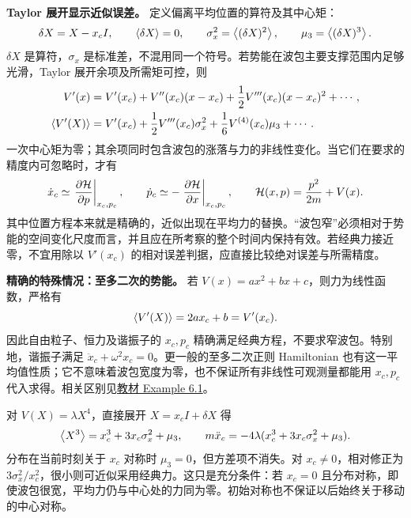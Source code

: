 \textbf{Taylor 展开显示近似误差。}
定义偏离平均位置的算符及其中心矩：
\begin{equation}
  \delta X=X-x_cI,\qquad
  \left\langle \delta X \right\rangle=0,\qquad
  \sigma_x^2=\left\langle (\delta X)^2 \right\rangle,\qquad
  \mu_3=\left\langle (\delta X)^3 \right\rangle.
\end{equation}
$\delta X$ 是算符，$\sigma_x$ 是标准差，不混用同一个符号。若势能在波包主要支撑范围内足够光滑，Taylor 展开余项及所需矩可控，则
\begin{align}
  V'(x)&=V'(x_c)+V''(x_c)(x-x_c)
          +\frac12V'''(x_c)(x-x_c)^2+\cdots,\\
  \left\langle V'(X) \right\rangle
    &=V'(x_c)+\frac12V'''(x_c)\sigma_x^2
      +\frac16V^{(4)}(x_c)\mu_3+\cdots.
  \label{eq:QM-C06-S01-force-expansion}
\end{align}
一次中心矩为零；其余项同时包含波包的涨落与力的非线性变化。当它们在要求的精度内可忽略时，才有
\begin{equation}
  \dot x_c\simeq\left.\frac{\partial \mathcal H}{\partial p}\right|_{x_c,p_c},
  \qquad
  \dot p_c\simeq-\left.\frac{\partial \mathcal H}{\partial x}\right|_{x_c,p_c},
  \qquad
  \mathcal H(x,p)=\frac{p^2}{2m}+V(x).
\end{equation}
其中位置方程本来就是精确的，近似出现在平均力的替换。“波包窄”必须相对于势能的空间变化尺度而言，并且应在所考察的整个时间内保持有效。若经典力接近零，不宜用除以 $V'(x_c)$ 的相对误差判据，应直接比较绝对误差与所需精度。

\textbf{精确的特殊情况：至多二次的势能。}
若 $V(x)=ax^2+bx+c$，则力为线性函数，严格有
\begin{equation}
  \left\langle V'(X) \right\rangle=2ax_c+b=V'(x_c).
\end{equation}
因此自由粒子、恒力及谐振子的 $x_c,p_c$ 精确满足经典方程，不要求窄波包。特别地，谐振子满足 $\ddot x_c+\omega^2x_c=0$。更一般的至多二次正则 Hamiltonian 也有这一平均值性质；它不意味着波包宽度为零，也不保证所有非线性可观测量都能用 $x_c,p_c$ 代入求得。相关区别见\hyperref[exercise:QM-C06-S01-E01]{教材 Example 6.1}。

对 $V(X)=\lambda X^4$，直接展开 $X=x_cI+\delta X$ 得
\begin{equation}
  \left\langle X^3 \right\rangle=x_c^3+3x_c\sigma_x^2+\mu_3,
  \qquad
  m\ddot x_c=-4\lambda(x_c^3+3x_c\sigma_x^2+\mu_3).
\end{equation}
分布在当前时刻关于 $x_c$ 对称时 $\mu_3=0$，但方差项不消失。对 $x_c\ne0$，相对修正为 $3\sigma_x^2/x_c^2$，很小则可近似采用经典力。这只是充分条件：若 $x_c=0$ 且分布对称，即使波包很宽，平均力仍与中心处的力同为零。初始对称也不保证以后始终关于移动的中心对称。


